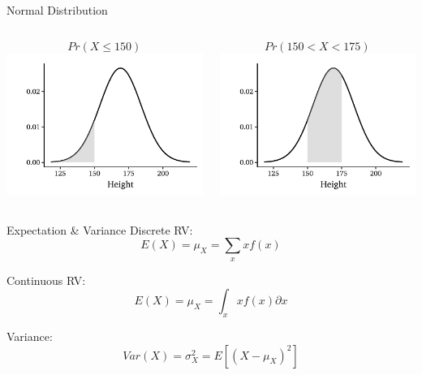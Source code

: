 \documentclass{./../div_teaching_slides}
\begin{document}
\begin{frame}{Normal Distribution}
\centering \vspace{1em}
\begin{columns}[c]
\begin{column}{0.475\textwidth}
$$ Pr(X\leq 150) $$
\includegraphics{./../../Output/height_norm2_ho2}
\end{column}
\begin{column}{0.475\textwidth}
$$ Pr(150<X<175) $$
\includegraphics{./../../Output/height_norm2_ho}
\end{column}
\end{columns}
\end{frame}

\begin{frame}{Expectation \& Variance }
Discrete RV:
$$ E(X) = \mu_X= \sum_x x f(x) $$

\vspace{1em}
Continuous RV:
$$ E(X) = \mu_X= \int_x x f(x) \partial x $$

\vspace{1em}
Variance:
$$ Var(X) = \sigma_X^2 = E [(X-\mu_X)^2] $$ 
\end{frame}
\end{document}
